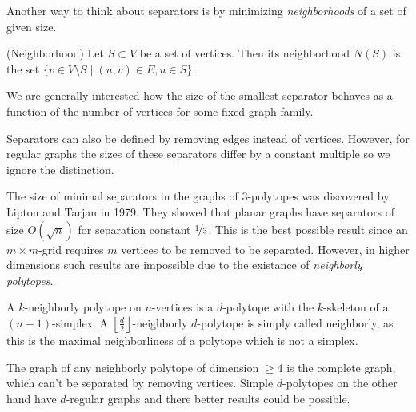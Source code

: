 Another way to think about separators is by minimizing \textit{neighborhoods} 
of a set of given size.

\begin{definition}
 (Neighborhood) Let $S \subset V$ be a set of vertices. Then its neighborhood 
$N(S)$ is the set $\{v \in V\setminus S \mid (u,v) \in E, u \in S\}$. 
\end{definition}

We are generally interested how the size of the smallest separator behaves as a 
function 
of the number of vertices for some fixed graph family.

Separators can also be defined by removing edges instead of vertices. However, 
for regular graphs the sizes of these separators differ by a constant multiple 
so we ignore the distinction.

The size of minimal separators in the graphs of 3-polytopes was discovered by 
Lipton and Tarjan \cite{LiTa} in 1979. They showed that planar graphs have 
separators of size $O(\sqrt{n})$ for separation constant $\nicefrac{1}{3}$. This is 
the best possible result since an $m\times m$-grid requires $m$ vertices to be 
removed to be separated. However, in higher dimensions such results are 
impossible due to the existance of \textit{neighborly polytopes}.

\begin{definition}
 A $k$-neighborly polytope on $n$-vertices is a $d$-polytope with the $k$-skeleton of a $(n-1)$-simplex.
A $\left\lfloor \frac{d}{2} \right\rfloor$-neighborly $d$-polytope is simply called neighborly, as this is the maximal
neighborliness of a polytope which is not a simplex.
\end{definition}

The graph of any neighborly polytope of dimension $\geq 4$ is the complete graph, which can't be separated by removing vertices. Simple 
$d$-polytopes on the other hand have $d$-regular graphs and there better results could be 
possible. 

%
%
%
%



